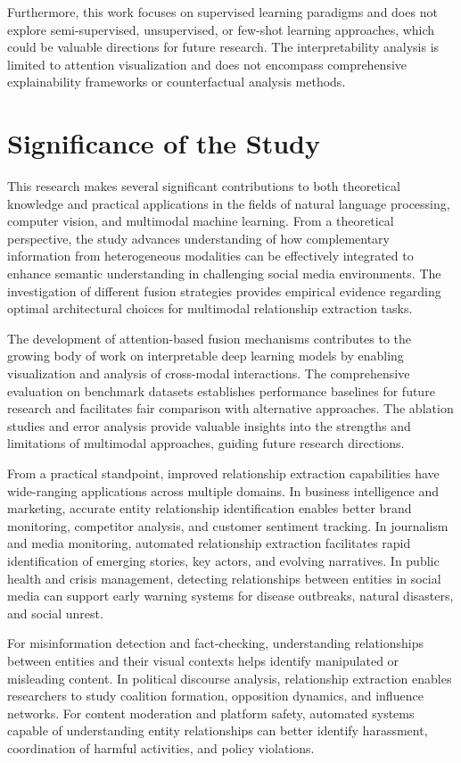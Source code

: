 \documentclass[12pt,a4paper]{report}
\begin{document}
Furthermore, this work focuses on supervised learning paradigms and does not explore semi-supervised, unsupervised, or few-shot learning approaches, which could be valuable directions for future research. The interpretability analysis is limited to attention visualization and does not encompass comprehensive explainability frameworks or counterfactual analysis methods.

\section{Significance of the Study}

This research makes several significant contributions to both theoretical knowledge and practical applications in the fields of natural language processing, computer vision, and multimodal machine learning. From a theoretical perspective, the study advances understanding of how complementary information from heterogeneous modalities can be effectively integrated to enhance semantic understanding in challenging social media environments. The investigation of different fusion strategies provides empirical evidence regarding optimal architectural choices for multimodal relationship extraction tasks.

The development of attention-based fusion mechanisms contributes to the growing body of work on interpretable deep learning models by enabling visualization and analysis of cross-modal interactions. The comprehensive evaluation on benchmark datasets establishes performance baselines for future research and facilitates fair comparison with alternative approaches. The ablation studies and error analysis provide valuable insights into the strengths and limitations of multimodal approaches, guiding future research directions.

From a practical standpoint, improved relationship extraction capabilities have wide-ranging applications across multiple domains. In business intelligence and marketing, accurate entity relationship identification enables better brand monitoring, competitor analysis, and customer sentiment tracking. In journalism and media monitoring, automated relationship extraction facilitates rapid identification of emerging stories, key actors, and evolving narratives. In public health and crisis management, detecting relationships between entities in social media can support early warning systems for disease outbreaks, natural disasters, and social unrest.

For misinformation detection and fact-checking, understanding relationships between entities and their visual contexts helps identify manipulated or misleading content. In political discourse analysis, relationship extraction enables researchers to study coalition formation, opposition dynamics, and influence networks. For content moderation and platform safety, automated systems capable of understanding entity relationships can better identify harassment, coordination of harmful activities, and policy violations.
\end{document}

